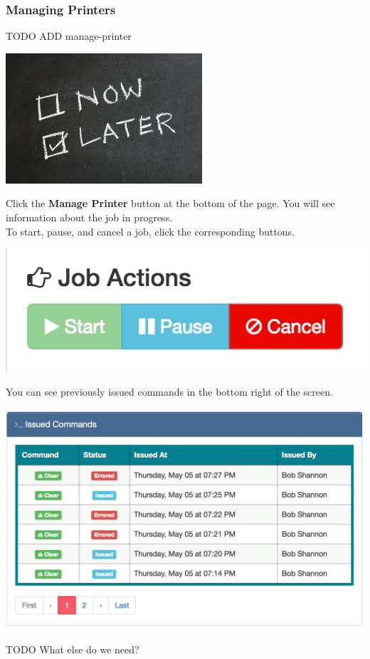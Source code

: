   \subsubsection{Managing Printers}
TODO ADD manage-printer
      \begin{center}
      \includegraphics[scale=1]{images/Now-Later.png}
    \end{center}
      Click the \textbf{Manage Printer} button at the bottom of the page.  You will see information about the job in progress.\\
      To start, pause, and cancel a job, click the corresponding buttons. 
      \begin{center}
      \includegraphics[scale=.8]{images/job-buttons.png}
    \end{center}
You can see previously issued commands in the bottom right of the screen.
      \begin{center}
      \includegraphics[scale=.3]{images/issued-commands.png}
    \end{center}


TODO What else do we need?

